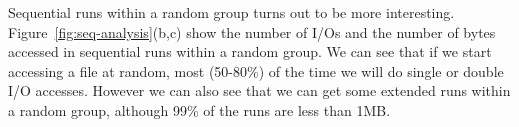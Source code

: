 Sequential runs within a random group turns out to be more
interesting.  Figure~\ref{fig:seq-analysis}(b,c) show the number of
I/Os and the number of bytes accessed in sequential runs within a
random group.  We can see that if we start accessing a file at random,
most (50-80\%) of the time we will do single or double I/O accesses.
However we can also see that we can get some extended runs within a
random group, although 99\% of the runs are less than 1MB.


